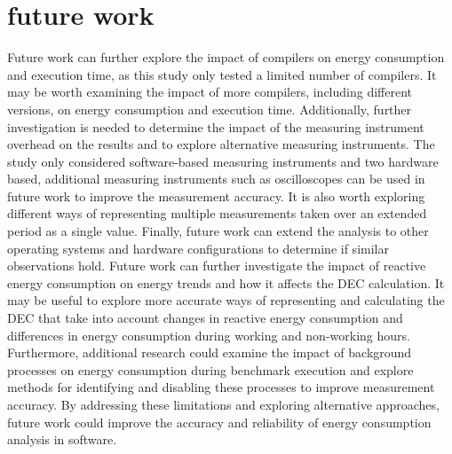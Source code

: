 \section{future work}
Future work can further explore the impact of compilers on energy consumption and execution time, as this study only tested a limited number of compilers. It may be worth examining the impact of more compilers, including different versions, on energy consumption and execution time. Additionally, further investigation is needed to determine the impact of the measuring instrument overhead on the results and to explore alternative measuring instruments. The study only considered software-based measuring instruments and two hardware based, additional measuring instruments such as oscilloscopes can be used in future work to improve the measurement accuracy. It is also worth exploring different ways of representing multiple measurements taken over an extended period as a single value. Finally, future work can extend the analysis to other operating systems and hardware configurations to determine if similar observations hold. Future work can further investigate the impact of reactive energy consumption on energy trends and how it affects the DEC calculation. It may be useful to explore more accurate ways of representing and calculating the DEC that take into account changes in reactive energy consumption and differences in energy consumption during working and non-working hours. Furthermore, additional research could examine the impact of background processes on energy consumption during benchmark execution and explore methods for identifying and disabling these processes to improve measurement accuracy. By addressing these limitations and exploring alternative approaches, future work could improve the accuracy and reliability of energy consumption analysis in software.